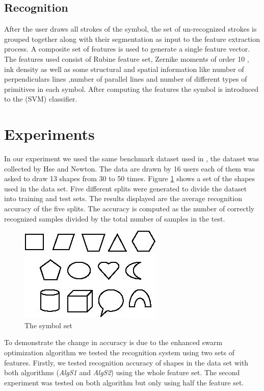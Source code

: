 \documentclass[10pt]{article}
\begin{document}
\subsection{Recognition}
\label{sec:Recognition}
After the user draws all strokes of the symbol, the set of un-recognized strokes is grouped together along with their segmentation as input to the feature extraction process. A composite set of features is used to generate a single feature vector. The features used consist of Rubine feature set,  Zernike moments of order 10 \cite{HeloiseBeautification}, ink density as well as some structural and spatial information like number of perpendiculars lines ,number of parallel lines and number of different types of primitives in each symbol. After computing the features the symbol is introduced to the (SVM) classifier. 

\cite{myPaper}  
\section{Experiments} 
\label{sec:Experiments}
In our experiment we used the same benchmark dataset used in \cite{myPaper}, the dataset was collected by Hse and Newton\cite{HeloiseBeautification}. The data are drawn by 16 users each of them was asked to draw 13 shapes from 30 to 50 times. Figure \ref{fig:symbolSet} shows a set of the shapes used in the data set. Five different splits were generated to divide the dataset into training and test sets. The results displayed are the average recognition accuracy of the five splits. The accuracy is computed as the number of correctly recognized samples divided by the total number of samples in the test.
	 
 \begin{figure}
  \centering 
 
		\includegraphics[scale=0.5]{symbolSet.PNG} 
		\caption[The Symbol Set] {The symbol set}   \label{fig:symbolSet}
	 \end{figure}
To demonstrate the change in accuracy is due to the enhanced swarm optimization algorithm we tested the recognition system using two sets of features. Firstly, we tested recognition accuracy of shapes in the data set with both algorithms (\textsl{AlgS1} and \textsl{AlgS2}) using the whole feature set. The second experiment was tested on both algorithm but only using half the feature set. 
\end{document}
